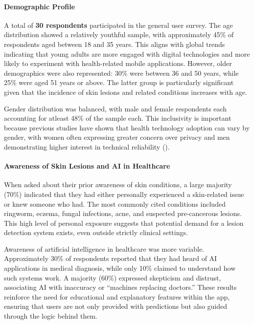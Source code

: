 \documentclass[
  12pt,
  oneside]{article}
\begin{document}
\paragraph{Demographic Profile}\label{demographic-profile}

A total of \textbf{30 respondents} participated in the general user
survey. The age distribution showed a relatively youthful sample, with
approximately 45\% of respondents aged between 18 and 35 years. This
aligns with global trends indicating that young adults are more engaged
with digital technologies and more likely to experiment with
health-related mobile applications. However, older demographics were
also represented: 30\% were between 36 and 50 years, while 25\% were
aged 51 years or above. The latter group is particularly significant
given that the incidence of skin lesions and related conditions
increases with age.

Gender distribution was balanced, with male and female respondents each
accounting for atleast 48\% of the sample each. This inclusivity is
important because previous studies have shown that health technology
adoption can vary by gender, with women often expressing greater concern
over privacy and men demonstrating higher interest in technical
reliability ().

\paragraph{Awareness of Skin Lesions and AI in
Healthcare}\label{awareness-of-skin-lesions-and-ai-in-healthcare}

When asked about their prior awareness of skin conditions, a large
majority (70\%) indicated that they had either personally experienced a
skin-related issue or knew someone who had. The most commonly cited
conditions included ringworm, eczema, fungal infections, acne, and
suspected pre-cancerous lesions. This high level of personal exposure
suggests that potential demand for a lesion detection system exists,
even outside strictly clinical settings.

Awareness of artificial intelligence in healthcare was more variable.
Approximately 30\% of respondents reported that they had heard of AI
applications in medical diagnosis, while only 10\% claimed to understand
how such systems work. A majority (60\%) expressed skepticism and
distrust, associating AI with inaccuracy or ``machines replacing
doctors.'' These results reinforce the need for educational and
explanatory features within the app, ensuring that users are not only
provided with predictions but also guided through the logic behind them.
\end{document}

